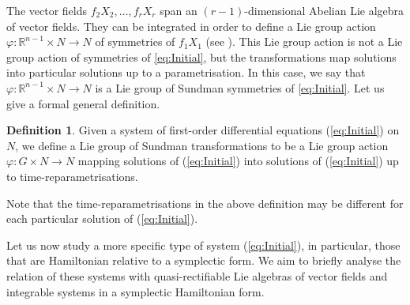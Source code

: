 \documentclass[12pt]{article}
\theoremstyle{plain}
\theoremstyle{definition}
\newtheorem{definition}[theorem]{Definition}
\numberwithin{equation}{section}
\begin{document}
The vector fields $f_2X_2,\ldots,f_rX_r$ span an $(r-1)$-dimensional  Abelian Lie algebra of vector fields. They can be integrated in order to define a Lie group action $\varphi:\mathbb{R}^{n-1}\times N\rightarrow N$ of symmetries of $f_1X_1$ (see \cite{LS93}). This Lie group action is not a Lie group action of symmetries of \eqref{eq:Initial}, but the transformations map solutions into particular solutions up to a parametrisation. In this case, we say that $\varphi:\mathbb{R}^{n-1}\times N\rightarrow N$ is a Lie group of Sundman symmetries of \eqref{eq:Initial}. Let us give a formal general definition.

\begin{definition} Given a system of first-order differential equations (\ref{eq:Initial}) on $N$, we define a Lie group of Sundman transformations to be a Lie group action $\varphi:G\times N\rightarrow N$ mapping solutions of (\ref{eq:Initial}) into solutions of (\ref{eq:Initial}) up to time-reparametrisations.
\end{definition}

Note that the time-reparametrisations in the above definition may be different for each particular solution of (\ref{eq:Initial}).

Let us now study a more specific type of system (\ref{eq:Initial}), in particular, those that are Hamiltonian relative to a symplectic form. We aim to briefly analyse the relation of these systems with quasi-rectifiable Lie algebras of vector fields and integrable systems in a symplectic Hamiltonian form.
\end{document}
